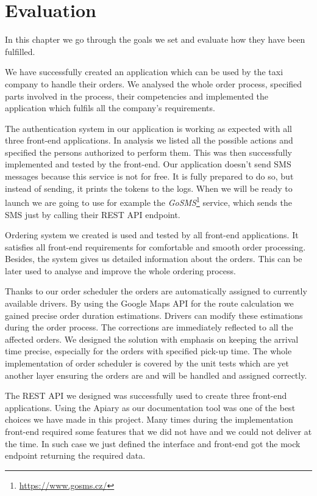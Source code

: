 \chapter{Evaluation}
In this chapter we go through the goals we set and evaluate how they have been fulfilled.

We have successfully created an application which can be used by the taxi company to handle their orders. We analysed the whole order process, specified parts involved in the process, their competencies and implemented the application which fulfils all the company's requirements. 

The authentication system in our application is working as expected with all three front-end applications. In analysis we listed all the possible actions and specified the persons authorized to perform them. This was then successfully implemented and tested by the front-end. Our application doesn't send SMS messages because this service is not for free. It is fully prepared to do so, but instead of sending, it prints the tokens to the logs. When we will be ready to launch we are going to use for example the \textit{GoSMS}\footnote{\url{https://www.gosms.cz/}} service, which sends the SMS just by calling their REST API endpoint.


Ordering system we created is used and tested by all front-end applications. It satisfies all front-end requirements for comfortable and smooth order processing. Besides, the system gives us detailed information about the orders. This can be later used to analyse and improve the whole ordering process.

Thanks to our order scheduler the orders are automatically assigned to currently available drivers. By using the Google Maps API for the route calculation we gained precise order duration estimations. Drivers can modify these estimations during the order process. The corrections are immediately reflected to all the affected orders. We designed the solution with emphasis on keeping the arrival time precise, especially for the orders with specified pick-up time. The whole implementation of order scheduler is covered by the unit tests which are yet another layer ensuring the orders are and will be handled and assigned correctly.


The REST API we designed was successfully used to create three front-end applications. Using the Apiary as our documentation tool was one of the best choices we have made in this project. Many times during the implementation front-end required some features that we did not have and we could not deliver at the time. In such case we just defined the interface and front-end got the mock endpoint returning the required data. 